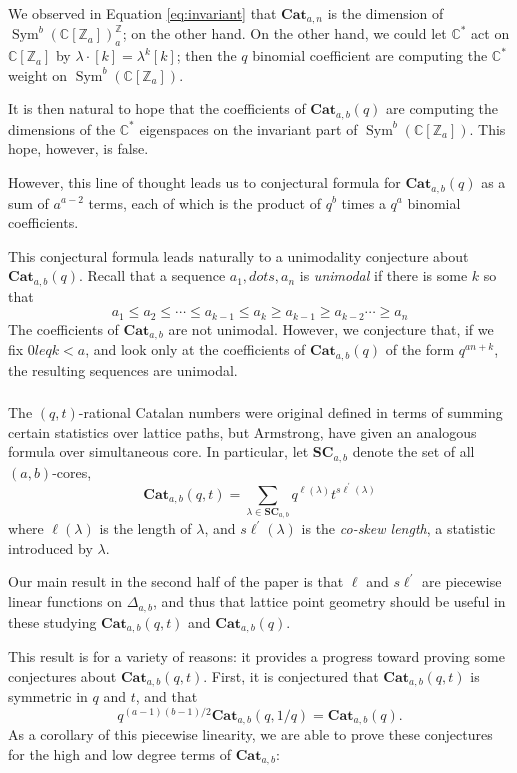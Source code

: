 \documentclass{amsart}[12pt]
\theoremstyle{definition}
\newcommand{\Z}{\mathbb{Z}}
\newcommand{\C}{\mathbb{C}}
\newcommand{\SC}{\mathbf{SC}}
\newcommand{\Cat}{\mathbf{Cat}}
\newcommand{\sk}{s\ell}
\DeclareMathOperator{\Sym}{Sym}
\begin{document}
We observed in Equation \ref{eq:invariant} that $\Cat_{a,n}$ is the dimension of $\Sym^b(\C[\Z_a])^\Z_a$; on the other hand.  On the other hand, we could let $\C^*$ act on $\C[\Z_a]$ by $\lambda\cdot [k]=\lambda^k[k]$; then the $q$ binomial coefficient are computing the $\C^*$ weight on $\Sym^b(\C[\Z_a])$.

It is then natural to hope that the coefficients of $\Cat_{a,b}(q)$ are computing the dimensions of the $\C^*$ eigenspaces on the invariant part of $\Sym^b(\C[\Z_a])$.  This hope, however, is false.

However, this line of thought leads us to conjectural formula for $\Cat_{a,b}(q)$ as a sum of $a^{a-2}$ terms, each of which is the product of $q^b$ times a $q^a$ binomial coefficients.   

This conjectural formula leads naturally to a unimodality conjecture about $\Cat_{a,b}(q)$.  Recall that a sequence $a_1,dots, a_n$ is \emph{unimodal} if there is some $k$ so that $$a_1\leq a_2\leq \cdots \leq a_{k-1}\leq a_k \geq a_{k-1} \geq a_{k-2}\cdots\geq a_n$$
The coefficients of $\Cat_{a,b}$ are not unimodal.  However, we conjecture that, if we fix $0
leq k <a$, and look only at the coefficients of $\Cat_{a,b}(q)$ of the form $q^{an+k}$, the resulting sequences are unimodal.


\subsubsection{ }

The $(q,t)$-rational Catalan numbers were original defined in terms of summing certain statistics over lattice paths, but Armstrong, have given an analogous formula over simultaneous core.  In particular, let $\SC_{a,b}$ denote the set of all $(a,b)$-cores, 
$$\Cat_{a,b}(q,t)=\sum_{\lambda\in \SC_{a,b}} q^{\ell(\lambda)}t^{\sk^\prime(\lambda)}$$
where $\ell(\lambda)$ is the length of $\lambda$, and $\sk^\prime(\lambda)$ is the \emph{co-skew length}, a statistic introduced by $\lambda$.

Our main result in the second half of the paper is that $\ell$ and $\sk^\prime$ are piecewise linear functions on $\Delta_{a,b}$,  and thus that lattice point geometry should be useful in these studying $\Cat_{a,b}(q,t)$ and $\Cat_{a,b}(q)$. 

This result is for a variety of reasons: it provides a progress toward proving some conjectures about $\Cat_{a,b}(q,t)$.
  First, it is conjectured that $\Cat_{a,b}(q,t)$ is symmetric in $q$ and $t$, and that $$q^{(a-1)(b-1)/2}\Cat_{a,b}(q,1/q)=\Cat_{a,b}(q).$$  
As a corollary of this piecewise linearity, we are able to prove these conjectures for the high and low degree terms of $\Cat_{a,b}$:
\end{document}

